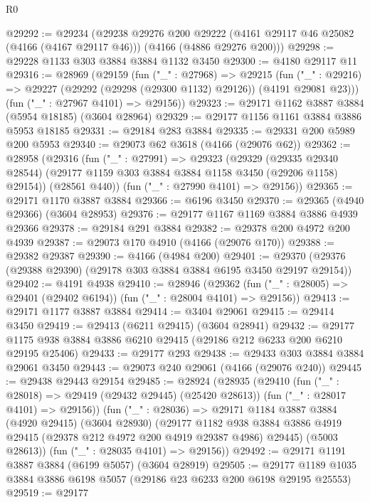 \begin{lexlean}{R0}
\begin{coremodule}
@29292 := @29234
    (@29238
      @29276
      @200
      @29222
      (@4161 @29117 @46 @25082 (@4166 (@4167 @29117 @46)))
      (@4166 (@4886 @29276 @200)))
@29298 := @29228 @1133 @303 @3884 @3884 @1132 @3450
@29300 := @4180 @29117 @11
@29316 := @28969
    (@29159
      (fun ("_" : @27968) =>
      @29215
        (fun ("_" : @29216) => @29227 (@29292 (@29298 (@29300 @1132) @29126)) (@4191 @29081 @23)))
      (fun ("_" : @27967 @4101) => @29156))
@29323 := @29171 @1162 @3887 @3884 (@5954 @18185) (@3604 @28964)
@29329 := @29177 @1156 @1161 @3884 @3886 @5953 @18185
@29331 := @29184 @283 @3884
@29335 := @29331 @200 @5989 @200 @5953
@29340 := @29073 @62 @3618 (@4166 (@29076 @62))
@29362 := @28958
    (@29316
      (fun ("_" : @27991) =>
      @29323
        (@29329
          (@29335 @29340 @28544)
          (@29177 @1159 @303 @3884 @3884 @1158 @3450 (@29206 @1158) @29154))
        (@28561 @440))
      (fun ("_" : @27990 @4101) => @29156))
@29365 := @29171 @1170 @3887 @3884
@29366 := @6196 @3450
@29370 := @29365 (@4940 @29366) (@3604 @28953)
@29376 := @29177 @1167 @1169 @3884 @3886 @4939 @29366
@29378 := @29184 @291 @3884
@29382 := @29378 @200 @4972 @200 @4939
@29387 := @29073 @170 @4910 (@4166 (@29076 @170))
@29388 := @29382 @29387
@29390 := @4166 (@4984 @200)
@29401 := @29370 (@29376 (@29388 @29390) (@29178 @303 @3884 @3884 @6195 @3450 @29197 @29154))
@29402 := @4191 @4938
@29410 := @28946
    (@29362 (fun ("_" : @28005) => @29401 (@29402 @6194)) (fun ("_" : @28004 @4101) => @29156))
@29413 := @29171 @1177 @3887 @3884
@29414 := @3404 @29061
@29415 := @29414 @3450
@29419 := @29413 (@6211 @29415) (@3604 @28941)
@29432 := @29177 @1175 @938 @3884 @3886 @6210 @29415 (@29186 @212 @6233 @200 @6210 @29195 @25406)
@29433 := @29177 @293
@29438 := @29433 @303 @3884 @3884 @29061 @3450
@29443 := @29073 @240 @29061 (@4166 (@29076 @240))
@29445 := @29438 @29443 @29154
@29485 := @28924
    (@28935
      (@29410
        (fun ("_" : @28018) => @29419 (@29432 @29445) (@25420 @28613))
        (fun ("_" : @28017 @4101) => @29156))
      (fun ("_" : @28036) =>
      @29171
        @1184
        @3887
        @3884
        (@4920 @29415)
        (@3604 @28930)
        (@29177
          @1182
          @938
          @3884
          @3886
          @4919
          @29415
          (@29378 @212 @4972 @200 @4919 @29387 @4986)
          @29445)
        (@5003 @28613))
      (fun ("_" : @28035 @4101) => @29156))
@29492 := @29171 @1191 @3887 @3884 (@6199 @5057) (@3604 @28919)
@29505 := @29177 @1189 @1035 @3884 @3886 @6198 @5057 (@29186 @23 @6233 @200 @6198 @29195 @25553)
@29519 := @29177

\end{coremodule}
\end{lexlean}
